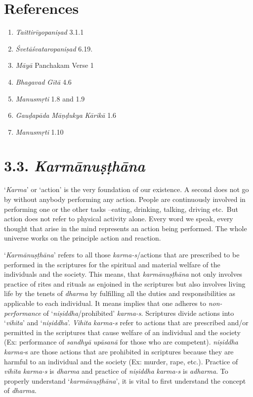 \section*{References}

\begin{enumerate}
\itemsep=0pt
\item
  \emph{Taittirīyopaniṣad} 3.1.1
\item
  \emph{Śvetāśvataropaniṣad} 6.19.
\item
  \emph{Māyā} Panchakam Verse 1
\item
  \emph{Bhagavad Gītā} 4.6
\item
  \emph{Manusmṛti} 1.8 and 1.9
\item
  \emph{Gauḍapāda} \emph{Māṇḍukya} \emph{Kārikā} 1.6
\item
  \emph{Manusmṛti} 1.10
\end{enumerate}
\newpage

\section*{3.3. \emph{Karmānuṣṭhāna}}

`\emph{Karma}' or `action' is the very foundation of our existence. A second does not go by without anybody performing any action. People are continuously involved in performing one or the other tasks --eating, drinking, talking, driving etc.\ But action does not refer to physical activity alone. Every word we speak, every thought that arise in the mind represents an action being performed. The whole universe works on the principle action and reaction.

`\emph{Karmānuṣṭhāna}' refers to all those \emph{karma-s}/actions that are prescribed to be performed in the scriptures for the spiritual and material welfare of the individuals and the society. This means, that \emph{karmānuṣṭhāna} not only involves practice of rites and rituals as enjoined in the scriptures but also involves living life by the tenets of \emph{dharma} by fulfilling all the duties and responsibilities as applicable to each individual. It means implies that one adheres to \emph{non-performance} of `\emph{niṣiddha}/prohibited' \emph{karma-s}. Scriptures divide actions into `\emph{vihita}' and `\emph{niṣiddha}'. \emph{Vihita} \emph{karma-s} refer to actions that are prescribed and/or permitted in the scriptures that cause welfare of an individual and the society (Ex: performance of \emph{sandhyā} \emph{upāsanā} for those who are competent). \emph{niṣiddha} \emph{karma-}s are those actions that are prohibited in scriptures because they are harmful to an individual and the society (Ex: murder, rape, etc.). Practice of \emph{vihita} \emph{karma-s} is \emph{dharma} and practice of \emph{niṣiddha} \emph{karma-s} is \emph{adharma}. To properly understand `\emph{karmānuṣṭhāna}', it is vital to first understand the concept of \emph{dharma}.

